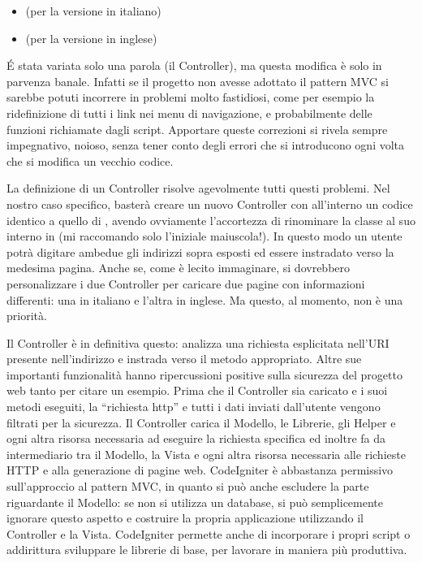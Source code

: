 \begin{itemize}
\item {} (per la versione in italiano)

\item {} (per la versione in inglese)
\end{itemize}

\'E stata variata solo una parola (il Controller), ma questa modifica è solo in parvenza banale. Infatti se il progetto non avesse adottato il pattern \ac{MVC} si sarebbe potuti incorrere in problemi molto fastidiosi, come per esempio la ridefinizione di tutti i link nei menu di navigazione, e probabilmente delle funzioni richiamate dagli script. Apportare queste correzioni si rivela sempre impegnativo, noioso, senza tener conto degli errori che si introducono ogni volta che si modifica un vecchio codice.

La definizione di un Controller risolve agevolmente tutti questi problemi. Nel nostro caso specifico, basterà creare un nuovo Controller  con all'interno un codice identico a quello di , avendo ovviamente l'accortezza di rinominare la classe al suo interno in  (mi raccomando solo l'iniziale maiuscola!). In questo modo un utente potrà digitare ambedue gli indirizzi sopra esposti ed essere instradato verso la medesima pagina. Anche se, come è lecito immaginare, si dovrebbero personalizzare i due Controller per caricare due pagine con informazioni differenti: una in italiano e l'altra in inglese. Ma questo, al momento, non è una priorità.

Il Controller è in definitiva questo: analizza una richiesta esplicitata nell'\ac{URI} presente nell'indirizzo e instrada verso il metodo appropriato. Altre sue importanti funzionalità hanno ripercussioni positive sulla sicurezza del progetto web tanto per citare un esempio. Prima che il Controller sia caricato e i suoi metodi eseguiti, la ``richiesta http'' e tutti i dati inviati dall'utente vengono filtrati per la sicurezza. Il Controller carica il Modello, le Librerie, gli Helper e ogni altra risorsa necessaria ad eseguire la richiesta specifica ed inoltre fa da intermediario tra il Modello, la Vista e ogni altra risorsa necessaria alle richieste \ac{HTTP} e alla generazione di pagine web. CodeIgniter è abbastanza permissivo sull'approccio al pattern \ac{MVC}, in quanto si può anche escludere la parte riguardante il Modello: se non si utilizza un database, si può semplicemente ignorare questo aspetto  e costruire la propria applicazione utilizzando il Controller e la Vista. CodeIgniter permette anche di incorporare i propri script o addirittura sviluppare le librerie di base, per lavorare in maniera più produttiva.


